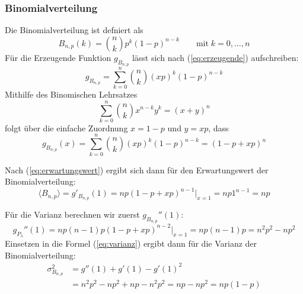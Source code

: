 \documentclass[a4paper]{article}
\begin{document}
\subsubsection{Binomialverteilung}
Die Binomialverteilung ist defniert als
\begin{equation}
    B_{n,p}(k) = \binom{n}{k} p^k (1-p)^{n-k}   \qquad \text{mit}\; k=0,\ldots,n
\end{equation}
Für die Erzeugende Funktion $g_{B_{n,p}}$ lässt sich nach (\ref{eq:erzeugende}) aufschreiben:
\begin{equation}
    g_{B_{n,p}} = \sum_{k=0}^n \binom{n}{k} (xp)^k (1-p)^{n-k}
\end{equation}
Mithilfe des Binomischen Lehrsatzes
\begin{equation}
    \sum_{k=0}^n \binom{n}{k} x^{n-k} y^k  = (x+y)^n
\end{equation}
folgt über die einfache Zuordnung $x=1-p$ und $y=xp$, dass
\begin{equation}
    g_{B_{n,p}}(x) = \sum_{k=0}^n \binom{n}{k} (xp)^k (1-p)^{n-k} = (1-p+xp)^n
\end{equation}

Nach (\ref{eq:erwartungswert}) ergibt sich dann für den Erwartungswert der Binomialverteilung:
\begin{equation}
    \langle B_{n,p} \rangle = g'_{B_{n,p}}(1)
    = np(1-p+xp)^{n-1} \Big|_{x=1}
    = np 1^{n-1} = np
\end{equation}

Für die Varianz berechnen wir zuerst $g_{B_{n,p}}''(1)$:
\begin{equation}
    g_{P_\lambda}''(1) = np(n-1)p(1-p+xp)^{n-2} \Big|_{x=1}
                       = np(n-1)p = n^2 p^2 - n p^2
\end{equation}
Einsetzen in die Formel (\ref{eq:varianz}) ergibt dann
für die Varianz der Binomialverteilung:
\begin{align*}
    \sigma_{B_{n,p}}^2 &= g''(1) + g'(1) - g'(1)^2 \\
                       &= n^2 p^2 - n p^2 + np - n^2 p^2 
                       = np-np^2 = np(1-p)
\end{align*}
\end{document}
